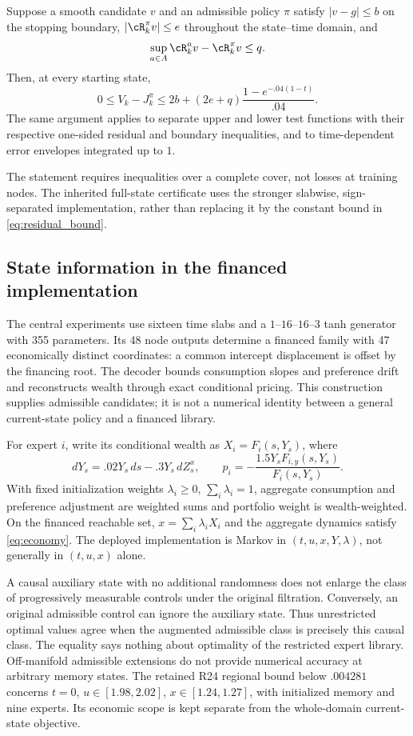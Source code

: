 \begin{proposition}\label{prop:verification}
Suppose a smooth candidate $v$ and an admissible policy $\pi$ satisfy $|v-g|\leq b$ on the stopping boundary, $|\cR_k^\pi v|\leq e$ throughout the state--time domain, and
\[
 \sup_{a\in A}\cR_k^a v-\cR_k^\pi v\leq q.
\]
Then, at every starting state,
\begin{equation}
 0\leq V_k-J_k^\pi\leq 2b+(2e+q)\frac{1-e^{-.04(1-t)}}{.04}.\label{eq:residual_bound}
\end{equation}
The same argument applies to separate upper and lower test functions with their respective one-sided residual and boundary inequalities, and to time-dependent error envelopes integrated up to $1$.
\end{proposition}
The statement requires inequalities over a complete cover, not losses at training nodes. The inherited full-state certificate uses the stronger slabwise, sign-separated implementation, rather than replacing it by the constant bound in \eqref{eq:residual_bound}.

\subsection{State information in the financed implementation}\label{sec:memory}
The central experiments use sixteen time slabs and a $1$--$16$--$16$--$3$ tanh generator with 355 parameters. Its 48 node outputs determine a financed family with 47 economically distinct coordinates: a common intercept displacement is offset by the financing root. The decoder bounds consumption slopes and preference drift and reconstructs wealth through exact conditional pricing. This construction supplies admissible candidates; it is not a numerical identity between a general current-state policy and a financed library.

For expert $i$, write its conditional wealth as $X_i=F_i(s,Y_s)$, where
\[
 dY_s=.02Y_s\,ds-.3Y_s\,dZ_s^x,\qquad
 p_i=-\frac{1.5Y_sF_{i,y}(s,Y_s)}{F_i(s,Y_s)}.
\]
With fixed initialization weights $\lambda_i\geq0$, $\sum_i\lambda_i=1$, aggregate consumption and preference adjustment are weighted sums and portfolio weight is wealth-weighted. On the financed reachable set, $x=\sum_i\lambda_iX_i$ and the aggregate dynamics satisfy \eqref{eq:economy}. The deployed implementation is Markov in $(t,u,x,Y,\lambda)$, not generally in $(t,u,x)$ alone.

A causal auxiliary state with no additional randomness does not enlarge the class of progressively measurable controls under the original filtration. Conversely, an original admissible control can ignore the auxiliary state. Thus unrestricted optimal values agree when the augmented admissible class is precisely this causal class. The equality says nothing about optimality of the restricted expert library. Off-manifold admissible extensions do not provide numerical accuracy at arbitrary memory states. The retained R24 regional bound below $.004281$ concerns $t=0$, $u\in[1.98,2.02]$, $x\in[1.24,1.27]$, with initialized memory and nine experts. Its economic scope is kept separate from the whole-domain current-state objective.
